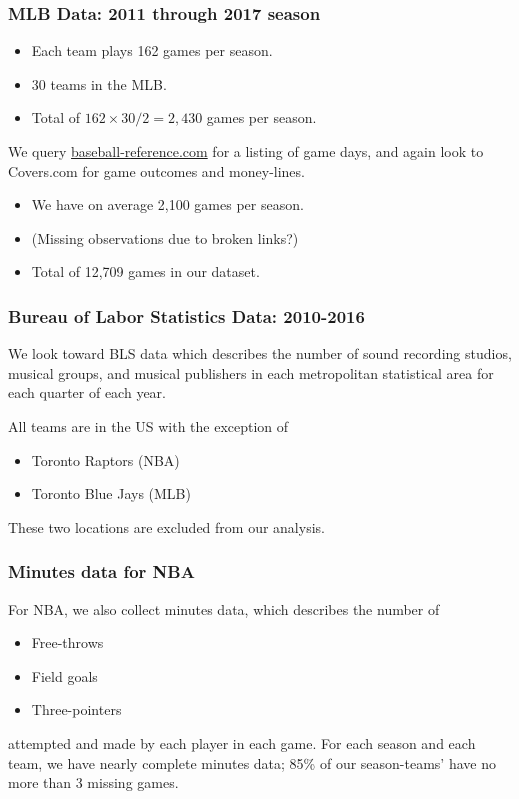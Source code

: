 \documentclass{beamer}
\begin{document}
\begin{frame}   \frametitle{MLB Data: 2011 through 2017 season}
  \begin{itemize}     \item Each team plays 162 games per season.
    \item 30 teams in the MLB.
    \item Total of $162 \times 30 / 2 = 2,430$ games per season.   \end{itemize}
  
  We query \href{http://www.baseball-reference.com/leagues/}{baseball-reference.com}
  for a listing of game days, and again look to Covers.com for game outcomes and money-lines.
  
  \begin{itemize}     \item We have on average 2,100 games per season.
    \item (Missing observations due to broken links?)
    \item Total of 12,709 games in our dataset.    \end{itemize} \end{frame}

\begin{frame}   \frametitle{Bureau of Labor Statistics Data: 2010-2016}
  We look toward BLS data which describes the number of sound recording
  studios, musical groups, and musical publishers in each metropolitan statistical area
  for each quarter of each year.
  
  All teams are in the US with the exception of 
  \begin{itemize}     \item Toronto Raptors (NBA)
    \item Toronto Blue Jays (MLB)   \end{itemize} 

  These two locations are excluded from our analysis. \end{frame}

\begin{frame}   \frametitle{Minutes data for NBA}
  For NBA, we also collect minutes data, which describes the number of 
  \begin{itemize}     \item Free-throws
    \item Field goals
    \item Three-pointers   \end{itemize}
  attempted and made by each player in each game. For each season and each team,
  we have nearly complete minutes data; 85\% of our season-teams' have no more than
  3 missing games. \end{frame}
\end{document}

